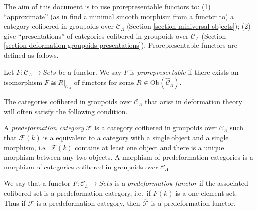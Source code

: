 \medskip\noindent
The aim of this document is to use prorepresentable functors to: (1) 
``approximate'' (as in find a minimal smooth morphism from a functor to) a 
category cofibered in groupoids over $\mathcal{C}_\Lambda$ (Section 
\ref{section-miniversal-objects}); (2) give ``presentations'' of categories 
cofibered in groupoids over $\mathcal{C}_\Lambda$ (Section 
\ref{section-deformation-groupoids-presentations}).  Prorepresentable functors 
are defined as follows.

\begin{definition}
\label{definition-prorepresentable}
Let $F: \mathcal{C}_\Lambda \to \textit{Sets}$ be a functor.
We  say $F$ is {\it prorepresentable} if there exists an isomorphism $F \cong 
\underline{R}|_{\mathcal{C}_\Lambda}$ of functors for some $R \in 
\text{Ob}(\widehat{\mathcal{C}}_\Lambda)$.
\end{definition}  



\noindent
The categories cofibered in groupoids over $\mathcal{C}_\Lambda$ that arise in 
deformation theory will often satisfy the following condition.

\begin{definition}
\label{definition-predeformation-category}
A {\it predeformation category} $\mathcal{F}$ is a category cofibered in 
groupoids over $\mathcal{C}_\Lambda$ such that $\mathcal{F}(k)$ is a equivalent 
to a category with a single object and a single morphism, i.e.\ $\mathcal{F}(k)$ 
contains at least one object and there is a unique morphism between any two 
objects. A morphism of predeformation categories is a morphism of categories 
cofibered in groupoids over $\mathcal{C}_\Lambda$.
\end{definition}

\begin{remark}
\label{remark-predeformation-functor}
We say that a functor $F: \mathcal{C}_\Lambda \to \textit{Sets}$ 
is a {\it predeformation functor} if the associated cofibered set is a 
predeformation category, i.e.\ if $F(k)$ is a one element set.  Thus if 
$\mathcal{F}$ is a predeformation category, then $\overline{\mathcal{F}}$ is a 
predeformation functor.
\end{remark}

